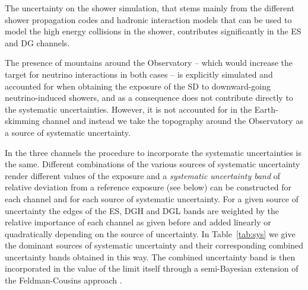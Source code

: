 \documentclass[reprint,showpacs,showkeys,amsmath,amssymb,aps,nofootinbib]{revtex4-1}
\begin{document}
The uncertainty on the shower simulation, that stems mainly from the different shower propagation codes
and hadronic interaction models that can be used to model the high energy collisions in the shower, 
contributes significantly in the ES and DG channels. 

The presence of mountains around the Observatory -- which would increase the target for 
neutrino interactions in both cases -- is explicitly simulated and 
accounted for when obtaining the exposure of the SD to downward-going neutrino-induced showers,
and as a consequence does not contribute directly to the systematic uncertainties.  
However, it is not accounted for in the Earth-skimming channel 
and instead we take the topography around
the Observatory as a source of systematic uncertainty.

In the three channels the procedure to incorporate the systematic uncertainties
is the same. Different combinations of the various
sources of systematic uncertainty render different values of the exposure
and a {\it systematic uncertainty band} of relative deviation from a 
reference exposure (see below) can be constructed for each channel and for each source
of systematic uncertainty.
For a given source of uncertainty the edges of the ES, DGH and DGL bands are 
weighted by the relative importance of each channel as given before and
added linearly or quadratically depending on the source of uncertainty.  
In Table~\ref{tab:sys} we give the dominant sources of systematic uncertainty
and their corresponding combined uncertainty bands obtained in this way.
The combined uncertainty band is then incorporated in the value of the limit itself 
through a semi-Bayesian extension \cite{Conrad} of the Feldman-Cousins 
approach \cite{Feldman-Cousins}.
\end{document}
